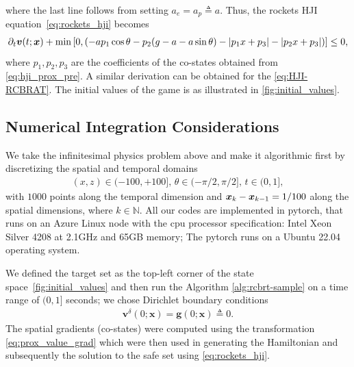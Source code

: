 %
where the last line follows from setting $a_e = a_p \triangleq a$. Thus, the rockets HJI equation~\eqref{eq:rockets_hji} becomes
%
\begin{align}
{\partial_t \bm{v}} (t; \bm{x}) + \min \left[0, (-a p_1 \cos \theta - p_2 (g - a - a\sin \theta) -  |p_1 x +  p_3 |  -|p_2 x + p_3 |)\right] \le 0,
\end{align}
%
where $p_1, p_2, p_3$ are the coefficients of the co-states obtained from \eqref{eq:hji_prox_pre}. A similar derivation can be obtained for the \eqref{eq:HJI-RCBRAT}. The initial values of the game is as illustrated in \autoref{fig:initial_values}.


\subsection{Numerical Integration Considerations}
We take the infinitesimal physics problem above and make it algorithmic first by discretizing the spatial and  temporal domains \ie 
%
\begin{align}
	(x, z) \in (-100, +100], \, {\theta} \in (-\pi/2, \pi/2], \,  t \in (0, 1],
	\label{eq:rocket_spatial_bounds}
\end{align}
with $1000$  points along the temporal dimension and $\bm{x}_k - \bm{x}_{k-1}=1/100$ along the spatial dimensions, where $k \in \mathbb{N}$. All our codes are implemented in pytorch, that runs on an Azure Linux node with the cpu processor specification: Intel Xeon Silver 4208 at 2.1GHz and 65GB memory; The pytorch runs on a Ubuntu 22.04 operating system. 

We defined the target set as the top-left corner of the state space~\autoref{fig:initial_values}  and then run the Algorithm \ref{alg:rcbrt-sample} on a time range of $(0, 1]$ seconds; we chose Dirichlet boundary conditions
%
\begin{align}
	\bm{v}^\delta(0; \bm{x}) = \bm{g}(0; \bm{x}) \triangleq 0.
	\label{eq:rockets_dirichlet}
\end{align} 
%
The spatial gradients (co-states) were computed using the transformation \eqref{eq:prox_value_grad} which were then used in generating the Hamiltonian and subsequently the solution to the safe set using \eqref{eq:rockets_hji}. %
 
